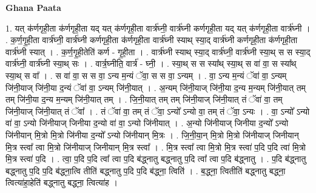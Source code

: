 \documentclass[17pt]{extarticle}
\begin{document}
\textbf{Ghana Paata } \newline

1. यत् क॑र्णगृही॒ता क॑र्णगृही॒ता यद् यत् क॑र्णगृही॒ता वार्त्र॑घ्नी॒ वार्त्र॑घ्नी कर्णगृही॒ता यद् यत् क॑र्णगृही॒ता वार्त्र॑घ्नी । . क॒र्ण॒गृ॒ही॒ता वार्त्र॑घ्नी॒ वार्त्र॑घ्नी कर्णगृही॒ता क॑र्णगृही॒ता वार्त्र॑घ्नी स्याथ् स्या॒द् वार्त्र॑घ्नी कर्णगृही॒ता क॑र्णगृही॒ता वार्त्र॑घ्नी स्यात् । . क॒र्ण॒गृ॒ही॒तेति॑ कर्ण - गृ॒ही॒ता । . वार्त्र॑घ्नी स्याथ् स्या॒द् वार्त्र॑घ्नी॒ वार्त्र॑घ्नी स्या॒थ् स स स्या॒द् वार्त्र॑घ्नी॒ वार्त्र॑घ्नी स्या॒थ् सः । . वार्त्र॒घ्नीति॒ वार्त्र॑ - घ्नी॒ । . स्या॒थ् स स स्या᳚थ् स्या॒थ् स वा॑ वा॒ स स्या᳚थ् स्या॒थ् स वा᳚ । . स वा॑ वा॒ स स वा॒ ऽन्य म॒न्यं ॅवा॒ स स वा॒ ऽन्यम् । . वा॒ ऽन्य म॒न्यं ॅवा॑ वा॒ ऽन्यम् जि॑नी॒याज् जि॑नी॒या द॒न्यं ॅवा॑ वा॒ ऽन्यम् जि॑नी॒यात् । . अ॒न्यम् जि॑नी॒याज् जि॑नी॒या द॒न्य म॒न्यम् जि॑नी॒यात् तम् तम् जि॑नी॒या द॒न्य म॒न्यम् जि॑नी॒यात् तम् । . जि॒नी॒यात् तम् तम् जि॑नी॒याज् जि॑नी॒यात् तं ॅवा॑ वा॒ तम् जि॑नी॒याज् जि॑नी॒यात् तं ॅवा᳚ । . तं ॅवा॑ वा॒ तम् तं ॅवा॒ ऽन्यो᳚ ऽन्यो वा॒ तम् तं ॅवा॒ ऽन्यः । . वा॒ ऽन्यो᳚ ऽन्यो वा॑ वा॒ ऽन्यो जि॑नीयाज् जिनीया द॒न्यो वा॑ वा॒ ऽन्यो जि॑नीयात् । . अ॒न्यो जि॑नीयाज् जिनीया द॒न्यो᳚ ऽन्यो जि॑नीयान् मि॒त्रो मि॒त्रो जि॑नीया द॒न्यो᳚ ऽन्यो जि॑नीयान् मि॒त्रः । . जि॒नी॒या॒न् मि॒त्रो मि॒त्रो जि॑नीयाज् जिनीयान् मि॒त्र स्त्वा᳚ त्वा मि॒त्रो जि॑नीयाज् जिनीयान् मि॒त्र स्त्वा᳚ । . मि॒त्र स्त्वा᳚ त्वा मि॒त्रो मि॒त्र स्त्वा॑ प॒दि प॒दि त्वा॑ मि॒त्रो मि॒त्र स्त्वा॑ प॒दि । . त्वा॒ प॒दि प॒दि त्वा᳚ त्वा प॒दि ब॑द्ध्नातु बद्ध्नातु प॒दि त्वा᳚ त्वा प॒दि ब॑द्ध्नातु । . प॒दि ब॑द्ध्नातु बद्ध्नातु प॒दि प॒दि ब॑द्ध्ना॒त्वि तीति॑ बद्ध्नातु प॒दि प॒दि ब॑द्ध्ना॒ त्विति॑ । . ब॒द्ध्ना॒ त्वितीति॑ बद्ध्नातु बद्ध्ना॒ त्वित्या॑हा॒हेति॑ बद्ध्नातु बद्ध्ना॒ त्वित्या॑ह । \newline
\end{document}
